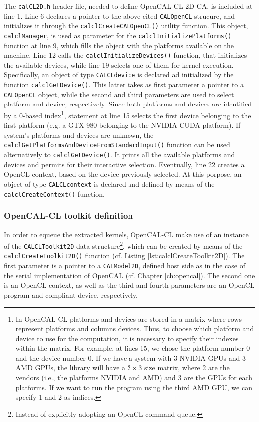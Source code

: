 The \verb'calCL2D.h' header file, needed to define OpenCAL-CL 2D CA,
is included at line 1. Line 6 declares a pointer to the above cited
\verb'CALOpenCL' strucure, and initializes it through the
\verb'calclCreateCALOpenCL()' utility function. This object,
\verb'calclManager', is used as parameter for the
\verb'calclInitializePlatforms()' function at line 9, which fills the
object with the platforms available on the machine. Line 12 calls the
\verb'calclInitializeDevices()' function, that initializes the
available devices, while line 19 selects one of them for kernel
execution. Specifically, an object of type \verb'CALCLdevice' is
declared ad initialized by the function \verb'calclGetDevice()'. This
latter takes as first parameter a pointer to a \verb'CALOpenCL'
object, while the second and third parameters are used to select
platform and device, respectively. Since both platforms and devices
are identified by a 0-based index\footnote{In OpenCAL-CL platforms and
  devices are stored in a matrix where rows represent platforms and
  columns devices. Thus, to choose which platform and device to use
  for the computation, it is necessary to specify their indexes within
  the matrix. For example, at lines 15, we chose the platform number 0
  and the device number 0. If we have a system with 3 NVIDIA GPUs and
  3 AMD GPUs, the library will have a $2 \times 3$ size matrix, where
  2 are the vendors (i.e., the platforms NVIDIA and AMD) and 3 are the
  GPUs for each platforms. If we want to run the program using the
  third AMD GPU, we can specify 1 and 2 as indices.}, statement at
line 15 selects the first device belonging to the first platform
(e.g. a GTX 980 belonging to the NVIDIA CUDA platform). If system's
platforms and devices are unknown, the
\verb'calclGetPlatformsAndDeviceFromStandardInput()' function can be
used alternatively to \verb'calclGetDevice()'. It prints all the
available platforms and devices and permits for their interactive
selection. Eventually, line 22 creates a OpenCL context, based on the
device previously selected. At this porpose, an object of type
\verb'CALCLcontext' is declared and defined by means of the
\verb'calclCreateContext()' function.


\subsubsection{OpenCAL-CL toolkit definition}

In order to equeue the extracted kernels, OpenCAL-CL make use of an
instance of the \verb'CALCLToolkit2D' data structure\footnote{Instead
  of explicitly adopting an OpenCL command queue.}, which can be
created by means of the \verb'calclCreateToolkit2D()' function
(cf. Listing \ref{lst:calclCreateToolkit2D}). The first parameter is a
pointer to a \verb'CALModel2D', defined host side as in the case of the
serial implementation of OpenCAL (cf. Chapter \ref{ch:opencal}). The
second one is an OpenCL context, as well as the third and fourth
parameters are an OpenCL program and compliant device, respectively.

